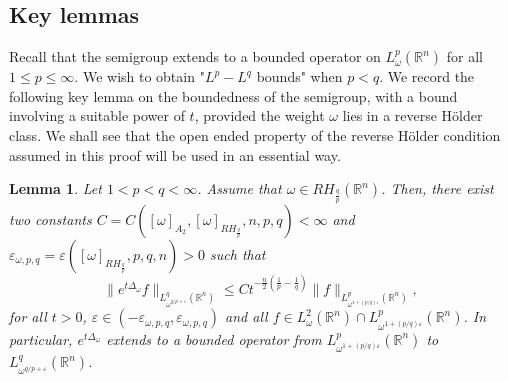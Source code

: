 \documentclass[12pt, letterpaper]{amsart}
\newtheorem{lem}[thm]{Lemma}
\theoremstyle{definition}
\theoremstyle{remark}
\numberwithin{equation}{section}
\begin{document}
\subsection{Key lemmas}
Recall that the semigroup extends to a bounded operator on $L^p_\omega(\mathbb{R}^n)$ for all $1 \leq p \leq \infty$. 
We wish to obtain "$L^p-L^q$ bounds" when $p<q$. We record the following key lemma on the boundedness of the semigroup, with a bound involving a suitable power of $t$, provided the weight $\omega$ lies in a reverse H\"older class. We shall see that the open ended property of the reverse H\"older condition assumed in this proof will be used in an essential way.
\begin{lem}\label{lem:HLS}
    Let $1 < p < q<\infty$. Assume that $\omega \in RH_{\frac{q}{p}}(\mathbb{R}^n)$. Then, there exist two constants $C = C([ \omega  ]_{A_2},[ \omega  ]_{RH_{\frac{q}{p}}},n,p,q)<\infty$ and $\varepsilon_{\omega, p,q}=\varepsilon(  [ \omega  ]_{RH_{\frac{q}{p}}},p,q,n)>0$ such that 
    \begin{equation*}
        \| e^{t\Delta_\omega} f \|_{L^q_{{\omega}^{q/p+\varepsilon}}(\mathbb{R}^n)} \leq C t^{-\frac{n}{2}(\frac{1}{p}-\frac{1}{q})} \|  f \|_{L^p_{\omega^{1+(p/q)\varepsilon}}(\mathbb{R}^n)},
        \end{equation*}
    for all $t>0$, $\varepsilon \in (-\varepsilon_{\omega, p,q},\varepsilon_{\omega, p,q})$ and all $f\in L^2_\omega(\mathbb{R}^n) \cap  L^p_{\omega^{1+(p/q)\varepsilon}}(\mathbb{R}^n)$. In particular, 
    $e^{t\Delta_\omega}$ extends to a bounded operator from $L^p_{\omega^{1+(p/q)\varepsilon}}(\mathbb{R}^n)$ to $L^q_{{\omega}^{q/p+\varepsilon}}(\mathbb{R}^n)$.
    \end{lem}
\end{document}
